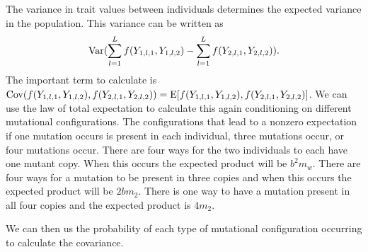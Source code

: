 The variance in trait values between individuals determines the expected
variance in the population. This variance can be written as
\begin{equation*}
  \mathrm{Var}( \sum_{l=1}^L f(Y_{1,l,1},Y_{1,l,2}) - \sum_{l=1}^L f(Y_{2,l,1},Y_{2,l,2}) ).
\end{equation*}
The important term to calculate is
$\mathrm{Cov}(f(Y_{1,l,1},Y_{1,l,2}),f(Y_{2,l,1},Y_{2,l,2})) = \mathrm{E}[f(Y_{1,l,1},Y_{1,l,2}),f(Y_{2,l,1},Y_{2,l,2})]$.
We can use the law of total expectation to calculate this again
conditioning on different mutational configurations. The configurations
that lead to a nonzero expectation if one mutation occurs is present in each individual,
three mutations occur, or four mutations occur. There are four ways for the two individuals
to each have one mutant copy. When this occurs the expected product will be $b^2m_w$. There
are four ways for a mutation to be present in three copies and when this occurs the expected
product will be $2b m_2$. There is one way to have a mutation present in all four copies
and the expected product is $4m_2$.

We can then us the probability of each type of mutational configuration occurring
to calculate the covariance. 

